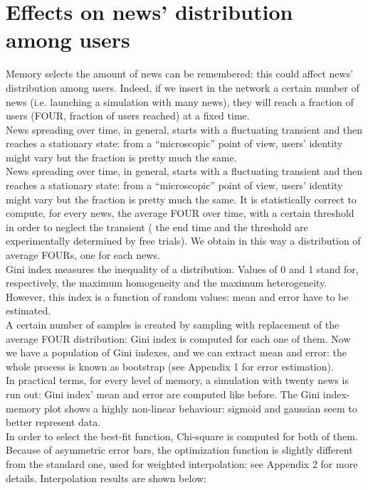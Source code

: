 \section{Effects on news' distribution among users}
Memory selects the amount of news can be remembered: this could affect news' distribution among users.
Indeed, if we insert in the network a certain number of news (i.e. launching a simulation with many news), they will reach a fraction of users (FOUR, fraction of users reached) at a fixed time.\\
News spreading over time, in general, starts with a fluctuating transient and then reaches a stationary state: from a ``microscopic'' point of view, users' identity might vary but the fraction is pretty much the same. \\
News spreading over time, in general, starts with a fluctuating transient and then reaches a stationary state: from a ``microscopic'' point of view, users' identity might vary but the fraction is pretty much the same.
It is statistically correct to compute, for every news, the average FOUR over time, with a certain threshold in order to neglect the transient ( the end time and the threshold are experimentally determined by free trials).
We obtain in this  way a distribution of average FOURs, one for each news.\\
Gini index measures the inequality of a distribution. Values of 0 and 1 stand for, respectively, the maximum homogeneity and the maximum heterogeneity.
However, this index is a function of random values: mean and error have to be estimated.\\
A certain number of samples is created by sampling with replacement of the average FOUR distribution: Gini index is computed for each one of them.
Now we have a population of Gini indexes, and we can extract mean and error: the whole process is known as bootstrap (see Appendix 1 for error estimation).\\
In practical terms, for every level of  memory, a simulation with twenty news is run out: Gini index' mean and error are computed like before.
The Gini index-memory plot shows a highly non-linear behaviour: sigmoid and gaussian seem to better represent data.\\
 In order to select the best-fit function, Chi-square is computed for both of them. \\
Because of asymmetric error bars, the optimization function is slightly different from the standard one, used for weighted interpolation: see Appendix 2 for more details.
Interpolation results are shown below:

